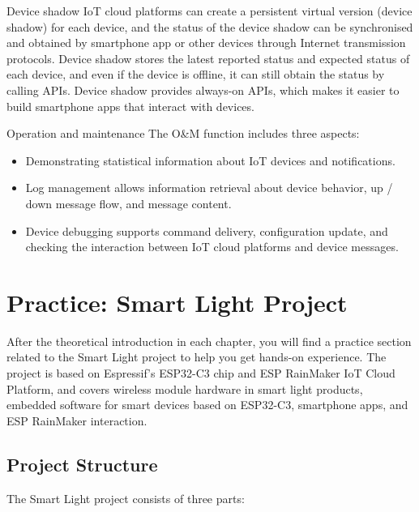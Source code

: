 \documentclass[a4paper,12pt]{book}
\begin{document}
\begin{term}{Device shadow}
    IoT cloud platforms can create a persistent virtual version (device shadow) for each device, and the status of the device shadow can be synchronised and obtained by smartphone app or other devices through Internet transmission protocols. Device shadow stores the latest reported status and expected status of each device, and even if the device is offline, it can still obtain the status by calling APIs. Device shadow provides always-on APIs, which makes it easier to build smartphone apps that interact with devices.
\end{term}

\begin{term}{Operation and maintenance}
    The O\&M function includes three aspects: 
    \begin{itemize}
        \item Demonstrating statistical information about IoT devices and notifications.
        \item Log management allows information retrieval about device behavior, up / down message flow, and message content.
        \item Device debugging supports command delivery, configuration update, and checking the interaction between IoT cloud platforms and device messages.
    \end{itemize}
\end{term}

\section{Practice: Smart Light Project}
After the theoretical introduction in each chapter, you will find a practice section related to the Smart Light project to help you get hands-on experience. The project is based on Espressif’s ESP32-C3 chip and ESP RainMaker IoT Cloud Platform, and covers wireless module hardware in smart light products, embedded software for smart devices based on ESP32-C3, smartphone apps, and ESP RainMaker interaction.


\subsection{Project Structure}
The Smart Light project consists of three parts:
\end{document}
